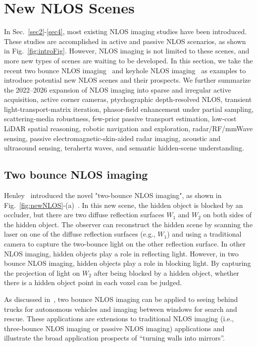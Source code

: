 \section{New NLOS Scenes} \label{sec5}
In Sec.~\ref{sec2}-\ref{sec4}, most existing NLOS imaging studies have been introduced. These studies are accomplished in active and passive NLOS scenarios, as shown in Fig.~\ref{fig:introFig}. However, NLOS imaging is not limited to these scenes, and more new types of scenes are waiting to be developed. In this section, we take the recent two bounce NLOS imaging~\cite{vedaldi_imaging_2020} and keyhole NLOS imaging~\cite{metzler_keyhole_2021} as examples to introduce potential new NLOS scenes and their prospects. We further summarize the 2022--2026 expansion of NLOS imaging into sparse and irregular active acquisition, active corner cameras, ptychographic depth-resolved NLOS, transient light-transport-matrix iteration, phasor-field enhancement under partial sampling, scattering-media robustness, few-prior passive transport estimation, low-cost LiDAR spatial reasoning, robotic navigation and exploration, radar/RF/mmWave sensing, passive electromagnetic-skin-aided radar imaging, acoustic and ultrasound sensing, terahertz waves, and semantic hidden-scene understanding.

\subsection{Two bounce NLOS imaging}
Henley \etal~introduced the novel "two-bounce NLOS imaging", as shown in Fig.~\ref{fig:newNLOS}-(a)~\cite{vedaldi_imaging_2020}. In this new scene, the hidden object is blocked by an occluder, but there are two diffuse reflection surfaces $W_1$ and $W_2$ on both sides of the hidden object. The observer can reconstruct the hidden scene by scanning the laser on one of the diffuse reflection surfaces (e.g., $W_1$) and using a traditional camera to capture the two-bounce light on the other reflection surface. In other NLOS imaging, hidden objects play a role in reflecting light. However, in two bounce NLOS imaging, hidden objects play a role in blocking light. By capturing the projection of light on $W_2$ after being blocked by a hidden object, whether there is a hidden object point in each voxel can be judged.

As discussed in~\cite{vedaldi_imaging_2020}, two bounce NLOS imaging can be applied to seeing behind trucks for autonomous vehicles and imaging between windows for search and rescue. These applications are extensions to traditional NLOS imaging (i.e., three-bounce NLOS imaging or passive NLOS imaging) applications and illustrate the broad application prospects of ``turning walls into mirrors''.

